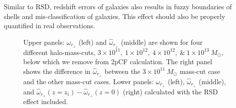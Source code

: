 \documentclass[iop]{emulateapj}
\begin{document}
Similar to RSD, redshift errors of galaxies
also results in fuzzy boundaries of shells and mis-classification of galaxies.
This effect should also be properly quantified in real observations.








\begin{figure}
   \caption{\label{fig_sys}
  Upper panels: $\omega_{r_\perp}$ (left) and $\hat{\omega}_{r_\perp}$ (middle) are shown for four different halo-mass-cuts, $3\times 10^{11},~1\times 10^{12},~4\times 10^{12},~\&~1\times 10^{13}~M_\odot$, 
  below which we remove from 2pCF calculation. 
  The right panel shows the difference in $\hat{\omega}_{r_\perp}$ between the $3\times 10^{11}~M_\odot$ mass-cut case and the other mass-cut cases. 
  Lower panels: $\omega_{r_\perp}$ (left), $\hat{\omega}_{r_\perp}$ (middle), and $\hat\omega_{r_\perp}(z=z_i)-\hat\omega_{r_\perp}(z=0)$ (right) calculated with the RSD effect included.
   }
\end{figure}
\end{document}
